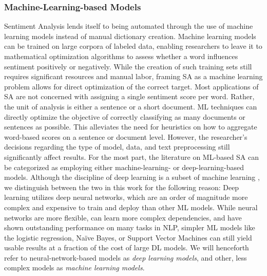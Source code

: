 \subsubsection{Machine-Learning-based Models}
\label{section-ml-based-sa}
Sentiment Analysis lends itself to being automated through the use of machine learning models instead of manual dictionary creation. Machine learning models can be trained on large corpora of labeled data, enabling researchers to leave it to mathematical optimization algorithms to assess whether a word influences sentiment positively or negatively. While the creation of such training sets still requires significant resources and manual labor, framing SA as a machine learning problem allows for direct optimization of the correct target. Most applications of SA are not concerned with assigning a single sentiment score per word. Rather, the unit of analysis is either a sentence or a short document. ML techniques can directly optimize the objective of correctly classifying as many documents or sentences as possible. This alleviates the need for heuristics on how to aggregate word-based scores on a sentence or document level. However, the researcher's decisions regarding the type of model, data, and text preprocessing still significantly affect results.\newline
For the most part, the literature on ML-based SA can be categorized as employing either machine-learning- or deep-learning-based models. Although the discipline of deep learning is a subset of machine learning , we distinguish between the two in this work for the following reason: Deep learning utilizes deep neural networks, which are an order of magnitude more complex and expensive to train and deploy than other ML models. While neural networks are more flexible, can learn more complex dependencies, and have shown outstanding performance on many tasks in NLP, simpler ML models like the logistic regression, Na\"ive Bayes, or Support Vector Machines can still yield usable results at a fraction of the cost of large DL models. We will henceforth refer to neural-network-based models as \emph{deep learning models}, and other, less complex models as \emph{machine learning models}.

